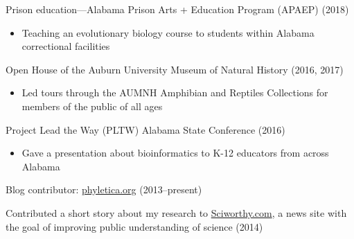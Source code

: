 \myHangIndent
Prison education---Alabama Prison Arts + Education Program (APAEP) (2018)
\begin{itemize}
    \item Teaching an evolutionary biology course to students within Alabama
        correctional facilities
\end{itemize}

\myHangIndent
Open House of the Auburn University Museum of Natural History (2016, 2017)
\begin{itemize}
    \item Led tours through the AUMNH Amphibian and Reptiles Collections for
        members of the public of all ages
\end{itemize}

\myHangIndent
Project Lead the Way (PLTW) Alabama State Conference (2016)
\begin{itemize}
    \item Gave a presentation about bioinformatics to K-12 educators from
        across Alabama
\end{itemize}

\myHangIndent
Blog contributor:
\href{http://phyletica.org/posts/}{phyletica.org} (2013--present)

\myHangIndent
Contributed a short story about my research to
\href{http://sciworthy.com/science-news/science-authors/whos-the-living-fossil/}{Sciworthy.com},
a news site with the goal of improving public understanding of science (2014)

